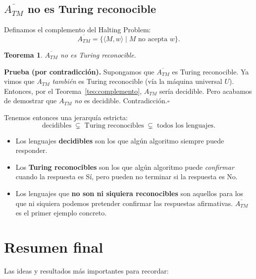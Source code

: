 \documentclass[11pt,a4paper]{article}
\theoremstyle{definicion}
\newtheorem{teorema}[definicion]{Teorema}
\newcommand{\enc}[1]{\langle #1 \rangle}
\begin{document}
\subsection{$\overline{A_{TM}}$ no es Turing reconocible}

Definamos el complemento del Halting Problem:
\[
\overline{A_{TM}} = \{ \enc{M, w} \mid M \text{ no acepta } w \}.
\]

\begin{teorema}
$\overline{A_{TM}}$ no es Turing reconocible.
\end{teorema}

\textbf{Prueba (por contradicción).} Supongamos que $\overline{A_{TM}}$ es Turing reconocible. Ya vimos que $A_{TM}$ \emph{también} es Turing reconocible (vía la máquina universal $U$). Entonces, por el Teorema~\ref{teo:complemento}, $A_{TM}$ sería decidible. Pero acabamos de demostrar que $A_{TM}$ \emph{no} es decidible. Contradicción.\hfill$\square$

\begin{idea}
Tenemos entonces una jerarquía estricta:
\[
\text{decidibles} \;\subsetneq\; \text{Turing reconocibles} \;\subsetneq\; \text{todos los lenguajes}.
\]
\begin{itemize}
    \item Los lenguajes \textbf{decidibles} son los que algún algoritmo siempre puede responder.
    \item Los \textbf{Turing reconocibles} son los que algún algoritmo puede \emph{confirmar} cuando la respuesta es Sí, pero pueden no terminar si la respuesta es No.
    \item Los lenguajes que \textbf{no son ni siquiera reconocibles} son aquellos para los que ni siquiera podemos pretender confirmar las respuestas afirmativas. $\overline{A_{TM}}$ es el primer ejemplo concreto.
\end{itemize}
\end{idea}

\section{Resumen final}

Las ideas y resultados más importantes para recordar:
\end{document}
